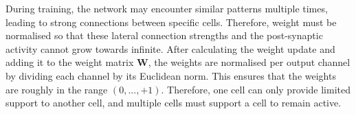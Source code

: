 During training, the network may encounter similar patterns multiple times, leading to strong connections between specific cells. Therefore, weight must be normalised so that these lateral connection strengths and the post-synaptic activity cannot grow towards infinite. After calculating the weight update and adding it to the weight matrix $\boldsymbol{W}$, the weights are normalised per output channel by dividing each channel by its Euclidean norm. This ensures that the weights are roughly in the range $(0, ..., +1)$.
Therefore, one cell can only provide limited support to another cell, and multiple cells must support a cell to remain active.





